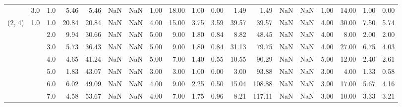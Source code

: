 \begin{tabular}{lllrrrrrrrrrrrrrrrr}
       & 3.0 & 1.0  &      5.46 &       5.46 &               NaN &                NaN &  1.00 &  18.00 &             1.00 &                         0.00 &      1.49 &       1.49 &               NaN &                NaN & 1.00 &  14.00 &             1.00 &                         0.00 \\
(2, 4) & 1.0 & 1.0  &     20.84 &      20.84 &               NaN &                NaN &  4.00 &  15.00 &             3.75 &                         3.59 &     39.57 &      39.57 &               NaN &                NaN & 4.00 &  30.00 &             7.50 &                         5.74 \\
       &     & 2.0  &      9.94 &      30.66 &               NaN &                NaN &  5.00 &   9.00 &             1.80 &                         0.84 &      8.82 &      48.45 &               NaN &                NaN & 4.00 &   8.00 &             2.00 &                         2.00 \\
       &     & 3.0  &      5.73 &      36.43 &               NaN &                NaN &  5.00 &   9.00 &             1.80 &                         0.84 &     31.13 &      79.75 &               NaN &                NaN & 4.00 &  27.00 &             6.75 &                         4.03 \\
       &     & 4.0  &      4.65 &      41.24 &               NaN &                NaN &  5.00 &   7.00 &             1.40 &                         0.55 &     10.55 &      90.29 &               NaN &                NaN & 5.00 &  12.00 &             2.40 &                         2.61 \\
       &     & 5.0  &      1.83 &      43.07 &               NaN &                NaN &  3.00 &   3.00 &             1.00 &                         0.00 &      3.00 &      93.88 &               NaN &                NaN & 3.00 &   4.00 &             1.33 &                         0.58 \\
       &     & 6.0  &      6.02 &      49.09 &               NaN &                NaN &  4.00 &   9.00 &             2.25 &                         0.50 &     15.04 &     108.88 &               NaN &                NaN & 3.00 &  17.00 &             5.67 &                         4.16 \\
       &     & 7.0  &      4.58 &      53.67 &               NaN &                NaN &  4.00 &   7.00 &             1.75 &                         0.96 &      8.21 &     117.11 &               NaN &                NaN & 3.00 &  10.00 &             3.33 &                         3.21 \\

\end{tabular}
